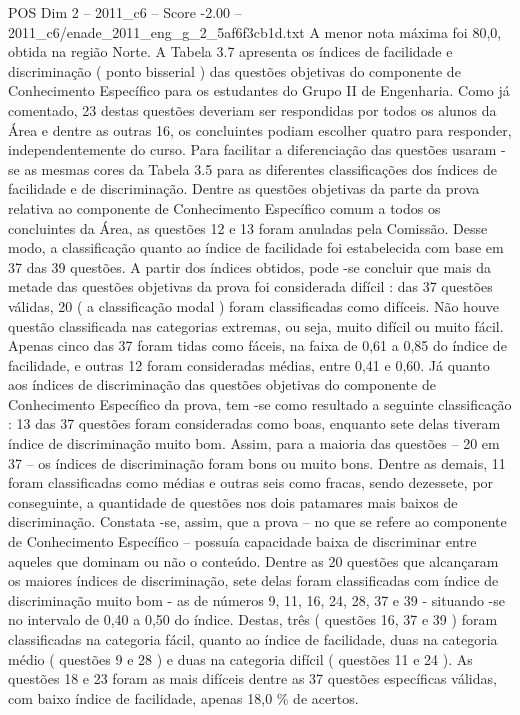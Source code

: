 \begin{textsample}{POS Dim 2 – 2011\_c6 – Score -2.00 – 2011\_c6/enade\_2011\_eng\_g\_2\_5af6f3cb1d.txt}
A menor nota máxima foi 80,0, obtida na região Norte.
A Tabela 3.7 apresenta os índices de facilidade e discriminação ( ponto bisserial ) das questões objetivas do componente de Conhecimento Específico para os estudantes do Grupo II de Engenharia.
Como já comentado, 23 destas questões deveriam ser respondidas por todos os alunos da Área e dentre as outras 16, os concluintes podiam escolher quatro para responder, independentemente do curso.
Para facilitar a diferenciação das questões usaram -se as mesmas cores da Tabela 3.5 para as diferentes classificações dos índices de facilidade e de discriminação.
Dentre as questões objetivas da parte da prova relativa ao componente de Conhecimento Específico comum a todos os concluintes da Área, as questões 12 e 13 foram anuladas pela Comissão.
Desse modo, a classificação quanto ao índice de facilidade foi estabelecida com base em 37 das 39 questões.
A partir dos índices obtidos, pode -se concluir que mais da metade das questões objetivas da prova foi considerada difícil : das 37 questões válidas, 20 ( a classificação modal ) foram classificadas como difíceis.
Não houve questão classificada nas categorias extremas, ou seja, muito difícil ou muito fácil.
Apenas cinco das 37 foram tidas como fáceis, na faixa de 0,61 a 0,85 do índice de facilidade, e outras 12 foram consideradas médias, entre 0,41 e 0,60.
Já quanto aos índices de discriminação das questões objetivas do componente de Conhecimento Específico da prova, tem -se como resultado a seguinte classificação : 13 das 37 questões foram consideradas como boas, enquanto sete delas tiveram índice de discriminação muito bom.
Assim, para a maioria das questões – 20 em 37 – os índices de discriminação foram bons ou muito bons.
Dentre as demais, 11 foram classificadas como médias e outras seis como fracas, sendo dezessete, por conseguinte, a quantidade de questões nos dois patamares mais baixos de discriminação.
Constata -se, assim, que a prova – no que se refere ao componente de Conhecimento Específico – possuía capacidade baixa de discriminar entre aqueles que dominam ou não o conteúdo.
Dentre as 20 questões que alcançaram os maiores índices de discriminação, sete delas foram classificadas com índice de discriminação muito bom - as de números 9, 11, 16, 24, 28, 37 e 39 - situando -se no intervalo de 0,40 a 0,50 do índice.
Destas, três ( questões 16, 37 e 39 ) foram classificadas na categoria fácil, quanto ao índice de facilidade, duas na categoria médio ( questões 9 e 28 ) e duas na categoria difícil ( questões 11 e 24 ).
As questões 18 e 23 foram as mais difíceis dentre as 37 questões específicas válidas, com baixo índice de facilidade, apenas 18,0 \% de acertos.

\end{textsample}
